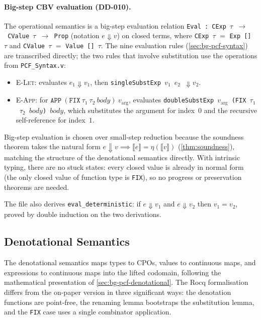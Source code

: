 \paragraph{Big-step CBV evaluation (DD-010).}
The operational semantics is a big-step evaluation relation
\texttt{Eval~:~CExp~$\tau$~$\to$~CValue~$\tau$~$\to$~Prop}
(notation $e \Downarrow v$) on closed terms, where
\texttt{CExp~$\tau$} $=$ \texttt{Exp~[]~$\tau$} and
\texttt{CValue~$\tau$} $=$ \texttt{Value~[]~$\tau$}.
The nine evaluation rules (\cref{sec:bg-pcf-syntax}) are
transcribed directly; the two rules that involve substitution use the
operations from \texttt{PCF\_Syntax.v}:
\begin{itemize}
  \item \textsc{E-Let}: evaluates $e_1 \Downarrow v_1$, then
    \texttt{singleSubstExp~$v_1$~$e_2$}~$\Downarrow v_2$.
  \item \textsc{E-App}: for
    $\texttt{APP}~(\texttt{FIX}~\tau_1~\tau_2~\mathit{body})~v_{\mathrm{arg}}$,
    evaluates
    \texttt{doubleSubstExp~$v_{\mathrm{arg}}$~(FIX~$\tau_1$~$\tau_2$~$\mathit{body}$)~$\mathit{body}$},
    which substitutes the argument for index~$0$ and the recursive
    self-reference for index~$1$.
\end{itemize}

Big-step evaluation is chosen over small-step reduction because the
soundness theorem takes the natural form
$e \Downarrow v \implies \llbracket e \rrbracket = \eta(\llbracket v \rrbracket)$
(\cref{thm:soundness}), matching the structure of the denotational
semantics directly.  With intrinsic typing, there are no stuck
states: every closed value is already in normal form (the only closed
value of function type is \texttt{FIX}), so no
progress or preservation theorems are needed.

The file also derives \texttt{eval\_deterministic}: if
$e \Downarrow v_1$ and $e \Downarrow v_2$ then $v_1 = v_2$, proved
by double induction on the two derivations.

\subsection{Denotational Semantics}
\label{sec:meth-pcf-denotational}


The denotational semantics maps types to CPOs, values to continuous
maps, and expressions to continuous maps into the lifted codomain,
following the mathematical presentation of \cref{sec:bg-pcf-denotational}.
The Rocq formalisation differs from the on-paper version in three
significant ways: the denotation functions are point-free, the renaming
lemma bootstraps the substitution lemma, and the \texttt{FIX} case
uses a single combinator application.

